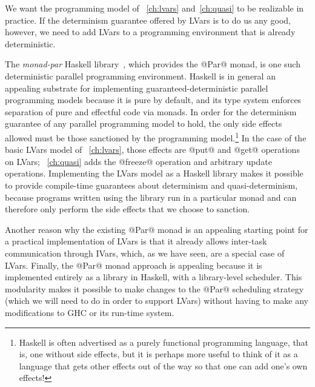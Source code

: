 We want the programming model of ~\ref{ch:lvars}
and~\ref{ch:quasi} to be realizable in practice.  If the determinism
guarantee offered by LVars is to do us any good, however, we need to
add LVars to a programming environment that is already deterministic.

The \emph{monad-par} Haskell library~\cite{monad-par}, which provides
the @Par@ monad, is one such deterministic parallel programming
environment.  Haskell is in general an appealing substrate for
implementing guaranteed-deterministic parallel programming models
because it is pure by default, and its type system enforces separation
of pure and effectful code via monads.  In order for the determinism
guarantee of any parallel programming model to hold, the only side
effects allowed must be those sanctioned by the programming
model.\footnote{Haskell is often advertised as a purely functional
programming language, that is, one without side effects, but it is
perhaps more useful to think of it as a language that gets other
effects out of the way so that one can add one's own effects!}  In the
case of the basic LVars model of ~\ref{ch:lvars}, those effects
are @put@ and @get@ operations on LVars;
 ~\ref{ch:quasi} adds
the @freeze@ operation and arbitrary update operations.  Implementing
the LVars model as a Haskell library makes it possible to provide
compile-time guarantees about determinism and quasi-determinism,
because programs written using the library run in a particular monad
and can therefore only perform the side effects that we choose to
sanction.

Another reason why the existing @Par@ monad is an appealing starting
point for a practical implementation of LVars is that it already allows
inter-task communication through IVars, which, as we have seen, are a
special case of LVars.  %
% 
%
Finally, the @Par@ monad approach is appealing
because it is implemented entirely as a library in Haskell, with a
library-level scheduler.  This modularity makes it possible to make
changes to the @Par@ scheduling strategy (which we will need to do in
order to support LVars) without having to make any modifications to
GHC or its run-time system.


